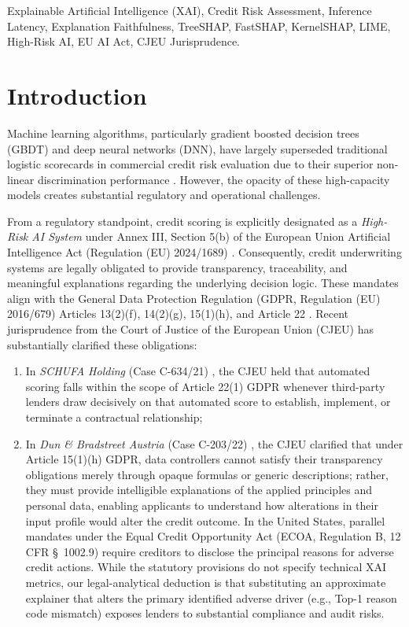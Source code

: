 \documentclass[conference]{IEEEtran}
\begin{document}
\begin{IEEEkeywords}
Explainable Artificial Intelligence (XAI), Credit Risk Assessment, Inference Latency, Explanation Faithfulness, TreeSHAP, FastSHAP, KernelSHAP, LIME, High-Risk AI, EU AI Act, CJEU Jurisprudence.
\end{IEEEkeywords}

\section{Introduction}
Machine learning algorithms, particularly gradient boosted decision trees (GBDT) and deep neural networks (DNN), have largely superseded traditional logistic scorecards in commercial credit risk evaluation due to their superior non-linear discrimination performance \cite{lessmann2015benchmarking, hand1997statistical}. However, the opacity of these high-capacity models creates substantial regulatory and operational challenges. 

From a regulatory standpoint, credit scoring is explicitly designated as a \textit{High-Risk AI System} under Annex III, Section 5(b) of the European Union Artificial Intelligence Act (Regulation (EU) 2024/1689) \cite{eu_ai_act_2024}. Consequently, credit underwriting systems are legally obligated to provide transparency, traceability, and meaningful explanations regarding the underlying decision logic. These mandates align with the General Data Protection Regulation (GDPR, Regulation (EU) 2016/679) Articles 13(2)(f), 14(2)(g), 15(1)(h), and Article 22 \cite{gdpr_2016}. 
Recent jurisprudence from the Court of Justice of the European Union (CJEU) has substantially clarified these obligations:
\begin{enumerate}
    \item In \textit{SCHUFA Holding} (Case C-634/21) \cite{cjeu_schufa_2023}, the CJEU held that automated scoring falls within the scope of Article 22(1) GDPR whenever third-party lenders draw decisively on that automated score to establish, implement, or terminate a contractual relationship;
    \item In \textit{Dun \& Bradstreet Austria} (Case C-203/22) \cite{cjeu_dun_bradstreet_2025}, the CJEU clarified that under Article 15(1)(h) GDPR, data controllers cannot satisfy their transparency obligations merely through opaque formulas or generic descriptions; rather, they must provide intelligible explanations of the applied principles and personal data, enabling applicants to understand how alterations in their input profile would alter the credit outcome. In the United States, parallel mandates under the Equal Credit Opportunity Act (ECOA, Regulation B, 12 CFR \S~1002.9) \cite{ecoa_reg_b} require creditors to disclose the principal reasons for adverse credit actions. While the statutory provisions do not specify technical XAI metrics, our legal-analytical deduction is that substituting an approximate explainer that alters the primary identified adverse driver (e.g., Top-1 reason code mismatch) exposes lenders to substantial compliance and audit risks.
\end{enumerate}
\end{document}
